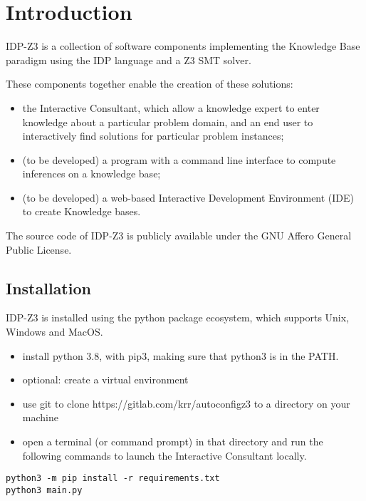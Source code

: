 \section{Introduction}
IDP-Z3 is a collection of software components implementing the Knowledge Base paradigm using the IDP language and a Z3 SMT solver.

These components together enable the creation of these solutions:
\begin{itemize}
  \item the Interactive Consultant, which allow a knowledge expert to enter knowledge about a particular problem domain, and an end user to interactively find solutions for particular problem instances;
  \item (to be developed) a program with a command line interface to compute inferences on a knowledge base;
  \item (to be developed) a web-based Interactive Development Environment (IDE) to create Knowledge bases.
\end{itemize}

The source code of IDP-Z3 is publicly available under the GNU Affero General Public License.

\subsection{Installation}

IDP-Z3 is installed using the python package ecosystem, which supports Unix, Windows and MacOS.

\begin{itemize}
  \item install python 3.8, with pip3, making sure that python3 is in the PATH.
  \item optional: create a virtual environment
  \item use git to clone https://gitlab.com/krr/autoconfigz3 to a directory on your machine
  \item open a terminal (or command prompt) in that directory and run the following commands to launch the Interactive Consultant locally.
\end{itemize}
\begin{lstlisting}
python3 -m pip install -r requirements.txt
python3 main.py
\end{lstlisting}

